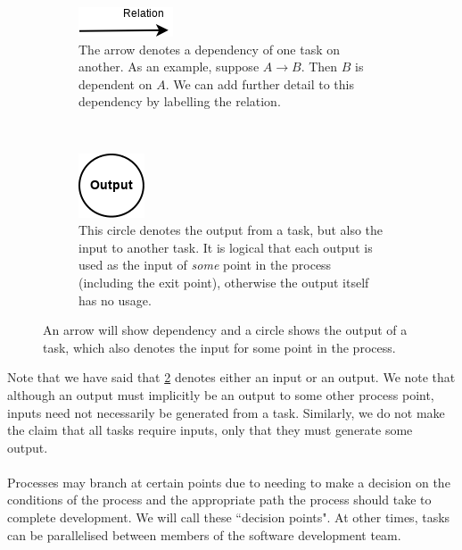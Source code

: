 \begin{figure}[h!]
\centering
\begin{subfigure}[b]{.45\textwidth}
\centering
\includegraphics[scale=0.6]{media/Dependency}
\caption{The arrow denotes a dependency of one task on another. As an example, suppose $A \to B$.
	Then $B$ is dependent on $A$.
We can add further detail to this dependency by labelling the relation.}
\label{depFigure}
\end{subfigure}
~
\begin{subfigure}[b]{.45\textwidth}
\centering
\includegraphics[scale=0.6]{media/Output}
\caption{This circle denotes the output from a task, but also the input to another task. It
is logical that each output is used as the input of {\em some} point in the process (including the
		exit point), otherwise the output itself has no usage.}
\label{outputFigure}
\end{subfigure}
\caption{An arrow will show dependency and a circle shows the output of a task,
which also denotes the input for some point in the process.} \label{depOutFigure}
\end{figure}

Note that we have said that \ref{outputFigure} denotes either an input or an
output.
We note that although an output must implicitly be an output to some other
process point, inputs need not necessarily be generated from a task.
Similarly, we do not make the claim that all tasks require inputs, only that
they must generate some output.\\
\\
Processes may branch at certain points due to needing to make a decision on the conditions of the
process and the appropriate path the process should take to complete development.
We will call these ``decision points".
At other times, tasks can be parallelised between members of the software development team.


